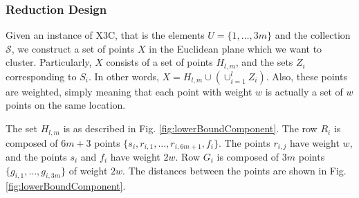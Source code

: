 \documentclass{article}
\newcommand{\mc}{\mathcal}
\begin{document}


%


\subsubsection{Reduction Design}
Given an instance of X3C, that is the elements $U = \{1, \ldots, 3m\}$ and the collection $\mc S$, we construct a set of points $X$ in the Euclidean plane which we want to cluster. Particularly, $X$ consists of a set of points $H_{l,m}$, and the sets $Z_i$ corresponding to $S_i$. In other words, $X = H_{l,m} \cup (\cup_{i=1}^l Z_i)$. Also, these points are weighted, simply meaning that each point with weight $w$ is actually a set of $w$ points on the same location.


The set $H_{l,m}$ is as described in Fig. \ref{fig:lowerBoundComponent}. The row $R_i$ is composed of $6m + 3$ points $\{s_i, r_{i, 1}, \ldots, r_{i, 6m+1}, f_i\}$. The points $r_{i, j}$ have weight $w$, and the points $s_i$ and $f_i$ have weight $2w$. Row $G_i$ is composed of $3m$ points $\{g_{i,1}, \ldots, g_{i, 3m}\}$ of weight $2w$. The distances between the points are shown in Fig. \ref{fig:lowerBoundComponent}.
\end{document}
